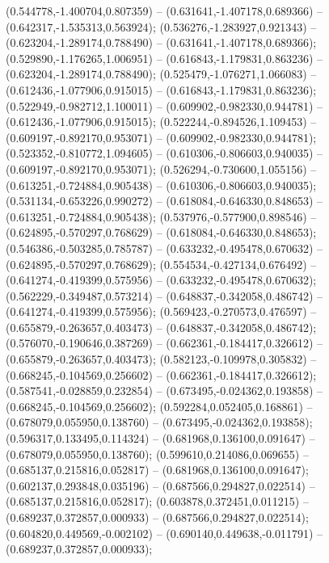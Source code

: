  (0.544778,-1.400704,0.807359) -- (0.631641,-1.407178,0.689366) -- (0.642317,-1.535313,0.563924);
 (0.536276,-1.283927,0.921343) -- (0.623204,-1.289174,0.788490) -- (0.631641,-1.407178,0.689366);
 (0.529890,-1.176265,1.006951) -- (0.616843,-1.179831,0.863236) -- (0.623204,-1.289174,0.788490);
 (0.525479,-1.076271,1.066083) -- (0.612436,-1.077906,0.915015) -- (0.616843,-1.179831,0.863236);
 (0.522949,-0.982712,1.100011) -- (0.609902,-0.982330,0.944781) -- (0.612436,-1.077906,0.915015);
 (0.522244,-0.894526,1.109453) -- (0.609197,-0.892170,0.953071) -- (0.609902,-0.982330,0.944781);
 (0.523352,-0.810772,1.094605) -- (0.610306,-0.806603,0.940035) -- (0.609197,-0.892170,0.953071);
 (0.526294,-0.730600,1.055156) -- (0.613251,-0.724884,0.905438) -- (0.610306,-0.806603,0.940035);
 (0.531134,-0.653226,0.990272) -- (0.618084,-0.646330,0.848653) -- (0.613251,-0.724884,0.905438);
 (0.537976,-0.577900,0.898546) -- (0.624895,-0.570297,0.768629) -- (0.618084,-0.646330,0.848653);
 (0.546386,-0.503285,0.785787) -- (0.633232,-0.495478,0.670632) -- (0.624895,-0.570297,0.768629);
 (0.554534,-0.427134,0.676492) -- (0.641274,-0.419399,0.575956) -- (0.633232,-0.495478,0.670632);
 (0.562229,-0.349487,0.573214) -- (0.648837,-0.342058,0.486742) -- (0.641274,-0.419399,0.575956);
 (0.569423,-0.270573,0.476597) -- (0.655879,-0.263657,0.403473) -- (0.648837,-0.342058,0.486742);
 (0.576070,-0.190646,0.387269) -- (0.662361,-0.184417,0.326612) -- (0.655879,-0.263657,0.403473);
 (0.582123,-0.109978,0.305832) -- (0.668245,-0.104569,0.256602) -- (0.662361,-0.184417,0.326612);
 (0.587541,-0.028859,0.232854) -- (0.673495,-0.024362,0.193858) -- (0.668245,-0.104569,0.256602);
 (0.592284,0.052405,0.168861) -- (0.678079,0.055950,0.138760) -- (0.673495,-0.024362,0.193858);
 (0.596317,0.133495,0.114324) -- (0.681968,0.136100,0.091647) -- (0.678079,0.055950,0.138760);
 (0.599610,0.214086,0.069655) -- (0.685137,0.215816,0.052817) -- (0.681968,0.136100,0.091647);
 (0.602137,0.293848,0.035196) -- (0.687566,0.294827,0.022514) -- (0.685137,0.215816,0.052817);
 (0.603878,0.372451,0.011215) -- (0.689237,0.372857,0.000933) -- (0.687566,0.294827,0.022514);
 (0.604820,0.449569,-0.002102) -- (0.690140,0.449638,-0.011791) -- (0.689237,0.372857,0.000933);

